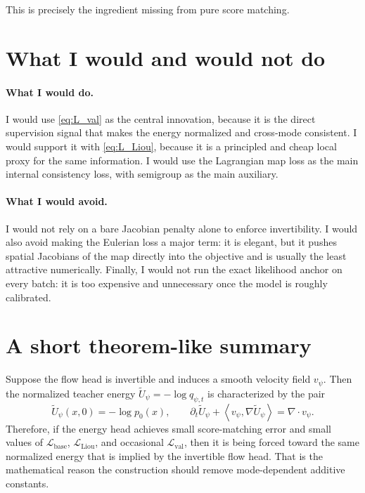 \documentclass[11pt]{article}
\newcommand{\divergence}{\nabla\!\cdot\!}
\newcommand{\inner}[2]{\left\langle #1, #2 \right\rangle}
\newcommand{\grad}{\nabla}
\begin{document}
This is precisely the ingredient missing from pure score matching.

\section{What I would and would not do}

\paragraph{What I would do.}
I would use \eqref{eq:L_val} as the central innovation, because it is the direct supervision signal that makes the energy normalized and cross-mode consistent. I would support it with \eqref{eq:L_Liou}, because it is a principled and cheap local proxy for the same information. I would use the Lagrangian map loss as the main internal consistency loss, with semigroup as the main auxiliary.

\paragraph{What I would avoid.}
I would not rely on a bare Jacobian penalty alone to enforce invertibility. I would also avoid making the Eulerian loss a major term: it is elegant, but it pushes spatial Jacobians of the map directly into the objective and is usually the least attractive numerically. Finally, I would not run the exact likelihood anchor on every batch: it is too expensive and unnecessary once the model is roughly calibrated.

\section{A short theorem-like summary}

Suppose the flow head is invertible and induces a smooth velocity field $v_{\psi}$. Then the normalized teacher energy $\widetilde U_{\psi}=-\log q_{\psi,t}$ is characterized by the pair
\begin{equation}
\widetilde U_{\psi}(x,0) = -\log p_0(x),
\qquad
\partial_t \widetilde U_{\psi} + \inner{v_{\psi}}{\grad \widetilde U_{\psi}} = \divergence v_{\psi}.
\label{eq:teacher_PDE_summary}
\end{equation}
Therefore, if the energy head achieves small score-matching error and small values of $\mathcal{L}_{\mathrm{base}}$, $\mathcal{L}_{\mathrm{Liou}}$, and occasional $\mathcal{L}_{\mathrm{val}}$, then it is being forced toward the same normalized energy that is implied by the invertible flow head. That is the mathematical reason the construction should remove mode-dependent additive constants.
\end{document}
